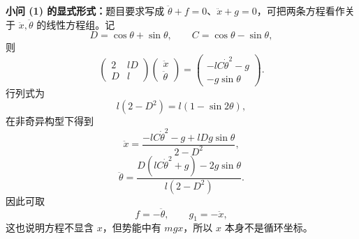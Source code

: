 \begin{question}[悬点受约束的单摆]
\begin{solution}
\medskip
\textbf{小问 (1) 的显式形式：}题目要求写成 $\ddot\theta+f=0$、$\ddot x+g=0$，可把两条方程看作关于 $\ddot x,\ddot\theta$ 的线性方程组。记
\[
  D=\cos\theta+\sin\theta,
  \qquad C=\cos\theta-\sin\theta,
\]
则
\[
  \begin{pmatrix}2&lD\\D&l\end{pmatrix}
  \begin{pmatrix}\ddot x\\\ddot\theta\end{pmatrix}
  =\begin{pmatrix}-lC\dot\theta^2-g\\-g\sin\theta\end{pmatrix}.
\]
行列式为
\[
  l(2-D^2)=l(1-\sin2\theta),
\]
在非奇异构型下得到
\[
  \ddot x=\frac{-lC\dot\theta^2-g+lDg\sin\theta}{2-D^2},
\]
\[
  \ddot\theta=\frac{D(lC\dot\theta^2+g)-2g\sin\theta}{l(2-D^2)}.
\]
因此可取
\[
  f=-\ddot\theta,
  \qquad g_1=-\ddot x,
\]
这也说明方程不显含 $x$，但势能中有 $mgx$，所以 $x$ 本身不是循环坐标。
\end{solution}
\end{question}

